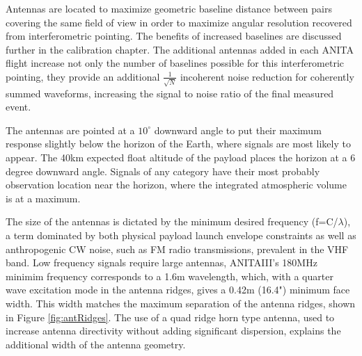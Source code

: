 	Antennas are located to maximize geometric baseline distance between pairs covering the same field of view in order to maximize angular resolution recovered from interferometric pointing.  The benefits of increased baselines are discussed further in the calibration chapter.  The additional antennas added in each ANITA flight increase not only the number of baselines possible for this interferometric pointing, they provide an additional $\frac{1}{\sqrt{N}}$ incoherent noise reduction for coherently summed waveforms, increasing the signal to noise ratio of the final measured event.  
	
	The antennas are pointed at a $10^{\circ}$ downward angle to put their maximum response slightly below the horizon of the Earth, where signals are most likely to appear.  The 40km expected float altitude of the payload places the horizon at a 6 degree downward angle.  Signals of any category have their most probably observation location near the horizon, where the integrated atmospheric volume is at a maximum.
	
	The size of the antennas is dictated by the minimum desired frequency (f=C/$\lambda$), a term dominated by both physical payload launch envelope constraints as well as anthropogenic CW noise, such as FM radio transmissions, prevalent in the VHF band. Low frequency signals require large antennas, ANITAIII's 180MHz minimim frequency corresponds to a 1.6m wavelength, which, with a quarter wave excitation mode in the antenna ridges, gives a 0.42m (16.4") minimum face width.  This width matches the maximum separation of the antenna ridges, shown in Figure \ref{fig:antRidges}.  The use of a quad ridge horn type antenna, used to increase antenna directivity without adding significant dispersion, explains the additional width of the antenna geometry.
	
